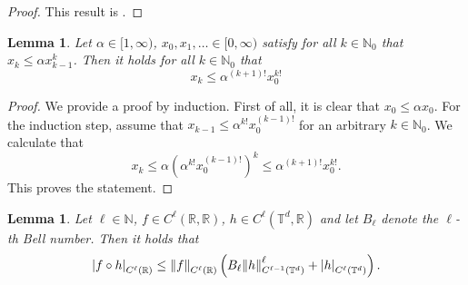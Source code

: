 \documentclass{article}
\numberwithin{equation}{section}
\newcommand{\T}{\mathbb{T}}
\newcommand{\R}{\mathbb{R}}
\newcommand{\N}{\mathbb{N}}
\newcommand{\1}{\mathbbm{1}}
\newtheorem{lemma}[theorem]{Lemma}
\begin{document}
\begin{proof}
This result is \cite[Corollary 4.3]{aj2021mlp}.
\end{proof}

\begin{lemma}\label{lem:recursion2}
Let $\alpha\in [1,\infty)$, $x_0,x_1, \ldots \in [0,\infty)$ satisfy for all $k\in \N_0$ that
${x_{k}\leq \alpha x_{k-1}^{k}}$. Then it holds for all $k\in\N_0$ that
\begin{equation}
    x_{k}\leq \alpha^{(k+1)!}x_0^{k!}
\end{equation}
\end{lemma}
\begin{proof}
We provide a proof by induction. First of all, it is clear that $x_0 \leq \alpha x_0$. For the induction step, assume that $x_{k-1}\leq \alpha^{k!}x_0^{(k-1)!}$ for an arbitrary $k\in\N_0$. We calculate that
\begin{equation}
    x_k \leq \alpha \left(\alpha^{k!}x_0^{(k-1)!}\right)^k \leq \alpha^{(k+1)!} x^{k!}_0. 
\end{equation}
This proves the statement. 
\end{proof}

\begin{lemma}\label{lem:faa-di-bruno}
Let $\ell\in \N$, $f\in C^\ell(\R,\R)$, $h\in C^\ell(\T^d, \R)$ and let $B_\ell$ denote the $\ell$-th Bell number. Then it holds that
\begin{equation}
     \abs{ f\circ h}_{C^\ell(\R)} \leq \norm{f}_{C^\ell(\R)}\left(B_\ell\norm{h}_{C^{\ell-1}(\T^d)}^\ell+ \abs{ h}_{C^\ell(\T^d)}\right).
\end{equation}
\end{lemma}
\end{document}
